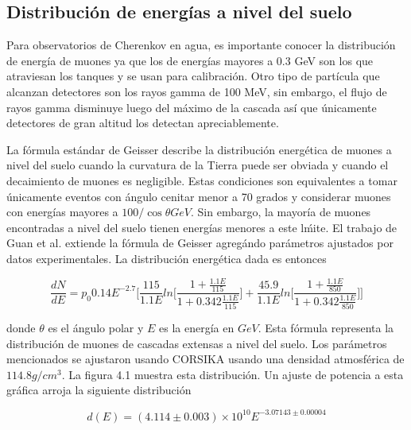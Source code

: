\documentclass{book}
\begin{document}
\subsection{Distribuci\'on de energ\'ias a nivel del suelo}
Para observatorios de Cherenkov en agua, es importante conocer la distribuci\'on de energ\'ia de muones ya que los de energ\'ias mayores a 0.3 GeV son los que atraviesan los tanques y se usan para calibraci\'on. Otro tipo de part\'icula que alcanzan detectores son los rayos gamma de 100 MeV, sin embargo, el flujo de rayos gamma disminuye luego del m\'aximo de la cascada as\'i que \'unicamente detectores de gran altitud los detectan apreciablemente. \citep{WATSON}

La f\'ormula est\'andar de Geisser describe la distribuci\'on energ\'etica de muones a nivel del suelo cuando la curvatura de la Tierra puede ser obviada y cuando el decaimiento de muones es negligible. Estas condiciones son equivalentes a tomar \'unicamente eventos con \'angulo cenitar menor a 70 grados y considerar muones con energ\'ias mayores a $100/\cos\theta GeV$. Sin embargo, la mayor\'ia de muones encontradas a nivel del suelo tienen energ\'ias menores a este l\'mite. El trabajo de Guan et al. extiende la f\'ormula de Geisser agreg\'ando par\'ametros ajustados por datos experimentales. La distribuci\'on energ\'etica dada es entonces

\begin{equation}
\frac{dN}{dE}=p_{0}0.14E^{-2.7}\Bigg[\frac{115}{1.1E}ln\Bigg[\frac{1+\frac{1.1E}{115}}{1+0.342\frac{1.1E}{115}}\Bigg]+\frac{45.9}{1.1E}ln\Bigg[\frac{1+\frac{1.1E}{850}}{1+0.342\frac{1.1E}{850}}\Bigg]\Bigg]
\end{equation}

donde $\theta$ es el \'angulo polar y $E$ es la energ\'ia en $GeV$. Esta f\'ormula representa la distribuci\'on de muones de cascadas extensas a nivel del suelo. Los par\'ametros mencionados se ajustaron usando CORSIKA usando una densidad atmosf\'erica de $114.8 g/cm^3$. La figura 4.1 muestra esta distribuci\'on. Un ajuste de potencia a esta gr\'afica arroja la siguiente distribuci\'on \citep{GUAN}

\begin{equation}
d(E)=(4.114\pm0.003)\times10^{10}E^{-3.07143\pm0.00004}
\end{equation}
\end{document}
